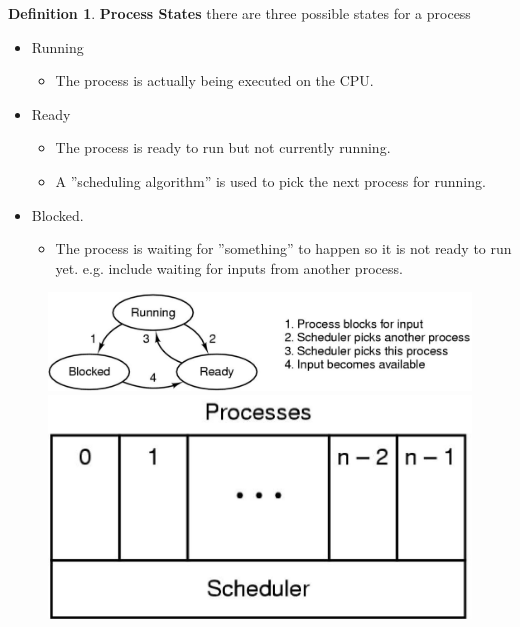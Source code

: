 \documentclass[12pt,a4paper]{article}
\theoremstyle{definition}
\newtheorem{definition}{Definition}[section]
\newenvironment{myitemize}
{ \begin{itemize}
    \setlength{\itemsep}{5pt}
    \setlength{\parskip}{0pt}
    \setlength{\parsep}{0pt}     }
{ \end{itemize}                  }
\begin{document}
\begin{definition}{\textbf{Process States}} there are three possible states for a process
	\begin{myitemize}
		\item Running 
		\begin{myitemize}
			\item The process is actually being executed on the CPU.
		\end{myitemize}
		\item Ready 
		\begin{myitemize}
			\item The process is ready to run but not currently running. 
			\item A ''scheduling algorithm'' is used to pick the next process for running.
		\end{myitemize}
		\item Blocked.
		\begin{myitemize}
			\item The process is waiting for ''something'' to happen so it is not ready to run yet. e.g. include waiting for inputs from another process.
		\end{myitemize}
	\end{myitemize}
\end{definition}

\begin{figure}[h!]
	\includegraphics[scale=0.3]{m1/processStates}
	\includegraphics[scale=0.3]{m1/processStates2}
	\centering
\end{figure}
\end{document}
